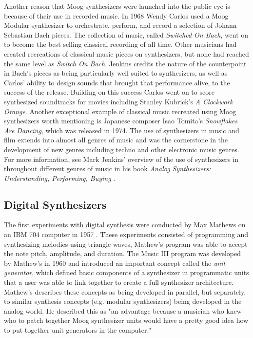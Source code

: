 Another reason that Moog synthesizers were launched into the public eye is because of their use in recorded music. In 1968 Wendy Carlos used a Moog Modular synthesizer to orchestrate, perform, and record a selection of Johann Sebastian Bach pieces. The collection of music, called \textit{Switched On Bach}, went on to become the best selling classical recording of all time. Other musicians had created recreations of classical music pieces on synthesizers, but none had reached the same level as \textit{Switch On Bach}. Jenkins \cite{jenkins2019analog} credits the nature of the counterpoint in Bach's pieces as being particularly well suited to synthesizers, as well as Carlos' ability to design sounds that brought that performance alive, to the success of the release. Building on this success Carlos went on to score synthesized soundtracks for movies including Stanley Kubrick's \textit{A Clockwork Orange}. Another exceptional example of classical music recreated using Moog synthesizers worth mentioning is Japanese composer Isao Tomita's \textit{Snowflakes Are Dancing}, which was released in 1974. The use of synthesizers in music and film extends into almost all genres of music and was the cornerstone in the development of new genres including techno and other electronic music genres. For more information, see Mark Jenkins' overview of the use of synthesizers in throughout different genres of music in his book \textit{Analog Synthesizers: Understanding, Performing, Buying} \cite{jenkins2019analog}.

\subsection{Digital Synthesizers}
The first experiments with digital synthesis were conducted by Max Mathews on an IBM 704 computer in 1957 \cite{roads1980interview}. These experiments consisted of programming and synthesizing melodies using triangle waves, Mathew's program was able to accept the note pitch, amplitude, and duration. The Music III program was developed by Mathew's in 1960 and introduced an important concept called the \textit{unit generator}, which defined basic components of a synthesizer in programmatic units that a user was able to link together to create a full synthesizer architecture. Mathew's describes these concepts as being developed in parallel, but separately, to similar synthesis concepts (e.g. modular synthesizers) being developed in the analog world. He described this as "an advantage because a musician who knew who to patch together Moog synthesizer units would have a pretty good idea how to put together unit generators in the computer."

